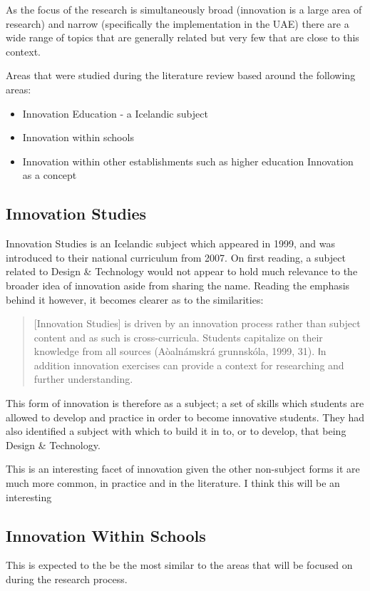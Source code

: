 As the focus of the research is simultaneously broad (innovation is a large area of research) and narrow (specifically the implementation in the UAE) there are a wide range of topics that are generally related but very few that are close to this context. 

Areas that were studied during the literature review based around the following areas:
\begin{itemize}
\item Innovation Education - a Icelandic subject
\item Innovation within schools
\item Innovation within other establishments such as higher education
\ite Innovation as a concept
\end{itemize}

\subsection{Innovation Studies}
Innovation Studies is an Icelandic subject which appeared in 1999, and was introduced to their national curriculum from 2007. On first reading, a subject related to Design & Technology would not appear to hold much relevance to the broader idea of innovation aside from sharing the name. Reading the emphasis behind it however, it becomes clearer as to the similarities:
\begin{quote}
[Innovation Studies] is driven by an innovation process rather than subject content and as such is cross-curricula. Students capitalize on their
knowledge from all sources (Aòalnámskrá grunnskóla, 1999, 31). Ⅰn addition innovation exercises can provide a context for researching and further understanding.
\end{quote} \cite{thorsteinsson2005innovation}

This form of innovation is therefore as a subject; a set of skills which students are allowed to develop and practice in order to become innovative students. They had also identified a subject with which to build it in to, or to develop, that being Design & Technology.

This is an interesting facet of innovation given the other non-subject forms it are much more common, in practice and in the literature. I think this will be an interesting 

\subsection{Innovation Within Schools}
This is expected to the be the most similar to the areas that will be focused on during the research process.

